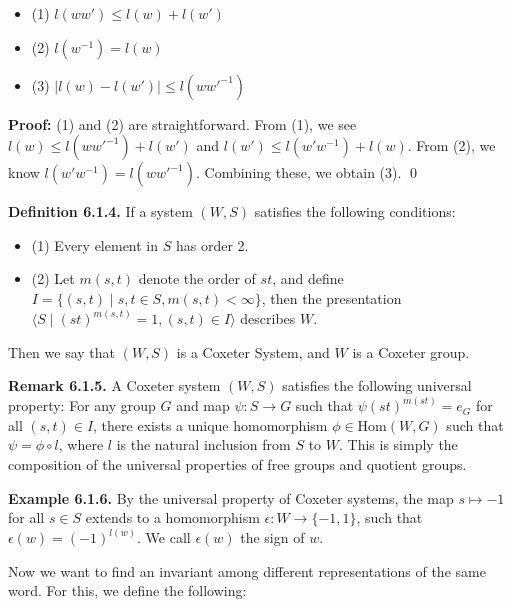 \documentclass[../main.tex]{subfiles}
\begin{document}
\begin{itemize}
    \item (1) \( l(ww') \le l(w) + l(w') \)
    \item (2) \( l(w^{-1}) = l(w) \)
    \item (3) \( |l(w) - l(w')| \le l(ww'^{-1}) \)
\end{itemize}

\noindent \textbf{Proof:} (1) and (2) are straightforward. From (1), we see \( l(w) \le l(ww'^{-1}) + l(w') \) and \( l(w') \le l(w'w^{-1}) + l(w) \). From (2), we know \( l(w'w^{-1}) = l(ww'^{-1}) \). Combining these, we obtain (3). \qed

\vspace{\baselineskip}
\noindent \textbf{Definition 6.1.4.} If a system \( (W, S) \) satisfies the following conditions:

\begin{itemize}
    \item (1) Every element in \( S \) has order 2.
    \item (2) Let \( m(s, t) \) denote the order of \( st \), and define \( I = \{ (s, t) \mid s, t \in S, m(s, t) < \infty \} \), then the presentation \( \langle S \mid (st)^{m(s,t)} = 1, (s,t) \in I \rangle \) describes \( W \).
\end{itemize}

Then we say that \( (W, S) \) is a Coxeter System, and \( W \) is a Coxeter group.

\vspace{\baselineskip}
\noindent \textbf{Remark 6.1.5.} A Coxeter system \( (W, S) \) satisfies the following universal property: For any group \( G \) and map \( \psi: S \to G \) such that \( \psi(st)^{m(st)} = e_G \) for all \( (s, t) \in I \), there exists a unique homomorphism \( \phi \in \text{Hom}(W, G) \) such that \( \psi = \phi \circ l \), where \( l \) is the natural inclusion from \( S \) to \( W \). This is simply the composition of the universal properties of free groups and quotient groups.

\vspace{\baselineskip}
\noindent \textbf{Example 6.1.6.} By the universal property of Coxeter systems, the map \( s \mapsto -1 \) for all \( s \in S \) extends to a homomorphism \( \epsilon: W \to \{-1, 1\} \), such that \( \epsilon(w) = (-1)^{l(w)} \). We call \( \epsilon(w) \) the sign of \( w \).

\vspace{\baselineskip}
Now we want to find an invariant among different representations of the same word. For this, we define the following:
\end{document}
